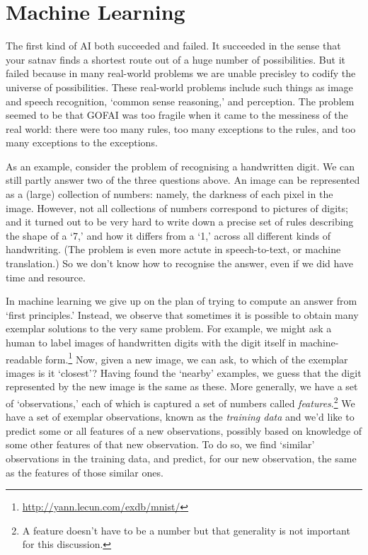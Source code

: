 \documentclass[10pt, a4paper, twocolumn]{article}
\begin{document}
\section{Machine Learning}

The first kind of AI both succeeded and failed. It succeeded in the sense that
your satnav finds a shortest route out of a huge number of possibilities. But it
failed because in many real-world problems we are unable precisley to codify the
universe of possibilities. These real-world problems include such things as
image and speech recognition, `common sense reasoning,' and perception. The
problem seemed to be that GOFAI was too fragile when it came to the messiness of
the real world: there were too many rules, too many exceptions to the rules, and
too many exceptions to the exceptions.

As an example, consider the problem of recognising a handwritten digit. We can
still partly answer two of the three questions above. An image can be
represented as a (large) collection of numbers: namely, the darkness of each
pixel in the image. However, not all collections of numbers correspond to
pictures of digits; and it turned out to be very hard to write down a precise
set of rules describing the shape of a `7,' and how it differs from a `1,'
across all different kinds of handwriting. (The problem is even more actute in
speech-to-text, or machine translation.) So we don't know how to recognise the
answer, even if we did have time and resource.

In machine learning we give up on the plan of trying to compute an answer from
`first principles.' Instead, we observe that sometimes it is possible to obtain
many exemplar solutions to the very same problem. For example, we might ask a
human to label images of handwritten digits with the digit itself in
machine-readable form.\footnote{\url{http://yann.lecun.com/exdb/mnist/}} Now,
given a new image, we can ask, to which of the exemplar images is it `closest'?
Having found the `nearby' examples, we guess that the digit represented by the
new image is the same as these. More generally, we have a set of `observations,'
each of which is captured a set of numbers called \emph{features}.\footnote{A
feature doesn't have to be a number but that generality is not important for
this discussion.} We have a set of exemplar observations, known as the
\emph{training data} and we'd like to predict some or all features of a new
observations, possibly based on knowledge of some other features of that new
observation. To do so, we find `similar' observations in the training data, and
predict, for our new observation, the same as the features of those similar ones.
\end{document}

